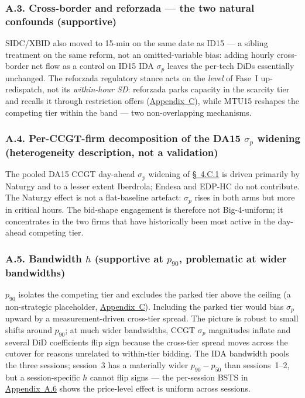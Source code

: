 \documentclass[11pt]{article}
\begin{document}
\subsubsection*{A.3. Cross-border and reforzada --- the two natural confounds \textnormal{(supportive)}}\label{sec:5c}\label{sec:5d}
SIDC/XBID also moved to 15-min on the same date as ID15 --- a sibling treatment on the same reform, not an omitted-variable bias: adding hourly cross-border net flow as a control on ID15 IDA $\sigma_p$ leaves the per-tech DiDs essentially unchanged. The reforzada regulatory stance acts on the \emph{level} of Fase~I up-redispatch, not its \emph{within-hour SD}: reforzada parks capacity in the scarcity tier and recalls it through restriction offers (\hyperref[sec:context]{Appendix~C}), while MTU15 reshapes the competing tier within the band --- two non-overlapping mechanisms.

\subsubsection*{A.4. Per-CCGT-firm decomposition of the DA15 $\sigma_p$ widening \textnormal{(heterogeneity description, not a validation)}}
The pooled DA15 CCGT day-ahead $\sigma_p$ widening of \hyperref[sec:4i]{\S~4.C.1} is driven primarily by Naturgy and to a lesser extent Iberdrola; Endesa and EDP-HC do not contribute. The Naturgy effect is not a flat-baseline artefact: $\sigma_p$ rises in both arms but more in critical hours. The bid-shape engagement is therefore not Big-4-uniform; it concentrates in the two firms that have historically been most active in the day-ahead competing tier.

\subsubsection*{A.5. Bandwidth $h$ \textnormal{(supportive at $p_{90}$, problematic at wider bandwidths)}}\label{sec:5e}
$p_{90}$ isolates the competing tier and excludes the parked tier above the ceiling (a non-strategic placeholder, \hyperref[sec:context]{Appendix~C}). Including the parked tier would bias $\sigma_p$ upward by a measurement-driven cross-tier spread. The picture is robust to small shifts around $p_{90}$; at much wider bandwidths, CCGT $\sigma_p$ magnitudes inflate and several DiD coefficients flip sign because the cross-tier spread moves across the cutover for reasons unrelated to within-tier bidding. The IDA bandwidth pools the three sessions; session~3 has a materially wider $p_{90}-p_{50}$ than sessions~1--2, but a session-specific $h$ cannot flip signs --- the per-session BSTS in \hyperref[sec:5f]{Appendix~A.6} shows the price-level effect is uniform across sessions.
\end{document}
